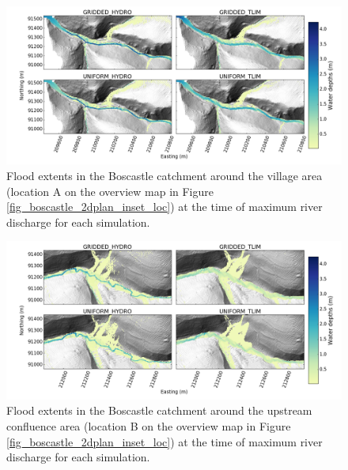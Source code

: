 \begin{figure}
\includegraphics[width=24cm]{chp_flood_figs_scripts/fig_boscastle_flood_enseble_town.png}
\caption{Flood extents in the Boscastle catchment around the village area (location A on the overview map in Figure \ref{fig_boscastle_2dplan_inset_loc}) at the time of maximum river discharge for each simulation. }
\label{fig_boscastle_2dplan_flood_ensemble_town}
\end{figure}

\begin{figure}
\includegraphics[width=24cm]{chp_flood_figs_scripts/fig_boscastle_flood_enseble_confluence.png}
\caption{Flood extents in the Boscastle catchment around the upstream confluence area (location B on the overview map in Figure \ref{fig_boscastle_2dplan_inset_loc}) at the time of maximum river discharge for each simulation.}
\label{fig_boscastle_2dplan_flood_ensemble_confluence}
\end{figure}

